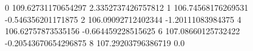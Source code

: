 0 109.62731170654297 2.3352737426757812
1 106.74568176269531 -0.546356201171875
2 106.09092712402344 -1.20111083984375
4 106.62757873535156 -0.664459228515625
6 107.08660125732422 -0.20543670654296875
8 107.29203796386719 0.0
